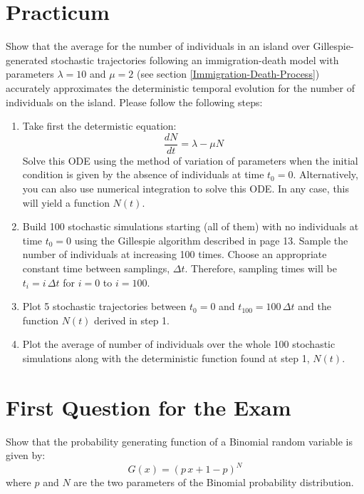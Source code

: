 \documentclass{article}
\begin{document}
\section{Practicum}
Show that the average for the number of individuals in an island over Gillespie-generated stochastic trajectories following an immigration-death model with parameters $\lambda=10$ and $\mu = 2$ (see section \ref{Immigration-Death-Process}) accurately approximates the deterministic temporal evolution for the number of individuals on the island. Please follow the following steps:
\begin{enumerate}
	\item Take first the determistic equation:
	\begin{equation}
	\frac{dN}{dt} = \lambda - \mu N
	\end{equation} 
	Solve this ODE using the method of variation of parameters when the initial condition is given by the absence of individuals at time $t_0 = 0$. Alternatively, you can also use numerical integration to solve this ODE. In any case, this will yield a function $N(t)$. 
	\item Build 100 stochastic simulations starting (all of them) with no individuals at time $t_0 = 0$ using the Gillespie algorithm described in page 13. Sample the number of individuals at increasing 100 times. Choose an appropriate constant time between samplings, $\Delta t$. Therefore, sampling times will be $t_i = i\,\Delta t$ for $i=0$ to $i=100$.   
	\item Plot 5 stochastic trajectories between $t_0=0$ and $t_{100} = 100\,\Delta t$ and the function $N(t)$ derived in step 1. 
	\item Plot the average of number of individuals over the whole 100 stochastic simulations along with the deterministic function found at step 1, $N(t)$. 
\end{enumerate}
 
\newpage
\setcounter{section}{0}
\renewcommand{\thesection}{E\arabic{section}}

\section{First Question for the Exam}
Show that the probability generating function of a Binomial random variable is given by:
\begin{equation}
	G(x) = (p\,x + 1-p)^N
\end{equation}
where $p$ and $N$ are the two parameters of the Binomial probability distribution. 
\smallskip
\end{document}
